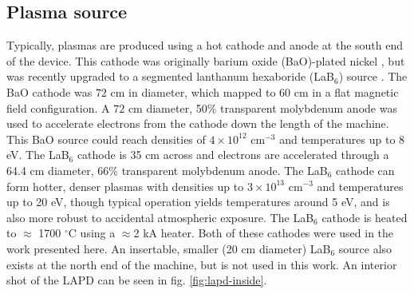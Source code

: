 \subsection{Plasma source}

Typically, plasmas are produced using a hot cathode and anode at the south end of the device. This cathode was originally barium oxide (BaO)-plated nickel \cite{gekelman_upgraded_2016}, but was recently upgraded to a segmented lanthanum hexaboride (LaB$_6$) source \cite{qian_design_2023}. The BaO cathode was $72$ cm in diameter, which mapped to 60 cm in a flat magnetic field configuration. A $72$ cm diameter, 50\% transparent molybdenum anode was used to accelerate electrons from the cathode down the length of the machine. This BaO source could reach densities of $4 \times 10^{12}$ cm$^{-3}$ and temperatures up to 8 eV. The LaB$_6$ cathode is 35 cm across and electrons are accelerated through a 64.4 cm diameter, 66\% transparent molybdenum anode. The LaB$_6$ cathode can form hotter, denser plasmas with densities up to $3 \times 10^{13}$ cm$^{-3}$ and temperatures up to 20 eV, though typical operation yields temperatures around 5 eV, and is also more robust to accidental atmospheric exposure. The LaB$_6$ cathode is heated to $\approx$ 1700 $^\circ$C using a $\approx$2 kA heater. Both of these cathodes were used in the work presented here. An insertable, smaller (20 cm diameter) LaB$_6$ source also exists at the north end of the machine, but is not used in this work. An interior shot of the LAPD can be seen in fig. \ref{fig:lapd-inside}.

